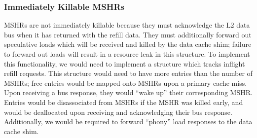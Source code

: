 \subsubsection{Immediately Killable MSHRs}
MSHRs are not immediately killable because they must acknowledge the L2 data bus when it has returned with the refill data. They must additionally forward out speculative loads which will be received and killed by the data cache shim; failure to forward out loads will result in a resource leak in this structure. To implement this functionality, we would need to implement a structure which tracks inflight refill requests. This structure would need to have more entries than the number of MSHRs; free entries would be mapped onto MSHRs upon a primary cache miss. Upon receiving a bus response, they would ``wake up'' their corresponding MSHR. Entries would be disassociated from MSHRs if the MSHR was killed early, and would be deallocated upon receiving and acknowledging their bus response. Additionally, we would be required to forward ``phony'' load responses to the data cache shim.
